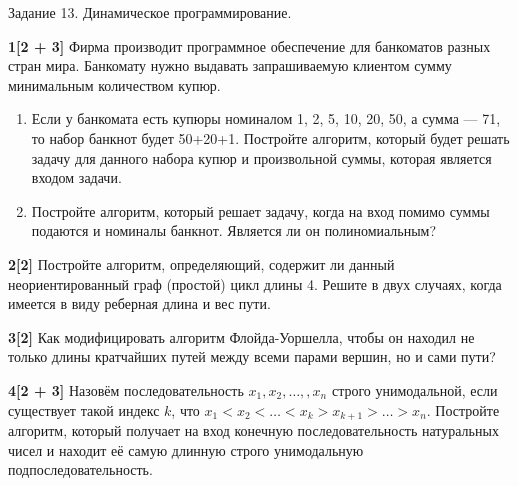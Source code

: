 \documentclass{article}
\begin{document}
\begin{center}
\Large {Задание 13. Динамическое программирование.}
\end{center}

\bigskip

\textbf{1[2 + 3]} Фирма производит программное обеспечение для банкоматов разных стран мира. Банкомату нужно выдавать запрашиваемую клиентом сумму минимальным количеством купюр.
\begin{enumerate}
    \item Если у банкомата есть купюры номиналом 1, 2, 5, 10, 20, 50, а сумма — 71, то набор банкнот
будет 50+20+1. Постройте алгоритм, который будет решать задачу для данного
набора купюр и произвольной суммы, которая является входом задачи.
    \item Постройте алгоритм, который решает задачу, когда на вход помимо суммы подаются
и номиналы банкнот. Является ли он полиномиальным?
\end{enumerate}

\medskip

\textbf{2[2]} Постройте алгоритм, определяющий, содержит ли данный неориентированный граф (простой) цикл длины 4. Решите в двух случаях, когда имеется в виду реберная длина и вес пути.

\medskip

\textbf{3[2]} Как модифицировать алгоритм Флойда-Уоршелла, чтобы он находил не только длины кратчайших путей между всеми парами вершин, но и сами пути?

\medskip

\textbf{4[2 + 3]} Назовём последовательность $x_1, x_2, \dots, , x_n$ строго унимодальной, если существует такой индекс $k$, что $x_1 < x_2 < \dots < x_k > x_{k+1} > \dots > x_n$. Постройте алгоритм, который получает на вход конечную последовательность натуральных чисел и находит её самую длинную строго унимодальную подпоследовательность.
\end{document}
